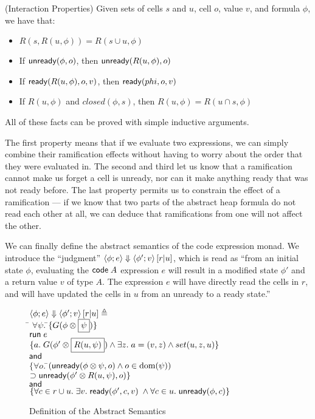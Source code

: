 \documentclass[preprint,natbib]{sigplanconf}
\begin{document}
\begin{prop}{(Interaction Properties)}
Given sets of cells $s$ and $u$, cell $o$, value $v$, and formula $\phi$, we have
that:
\begin{itemize}
\item $R(s, R(u, \phi)) = R(s \cup u, \phi)$
\item If $\mbox{\textsf{{unready}}}({\phi}, {o})$, then $\mbox{\textsf{{unready}}}({R(u, \phi)}, {o})$ 
\item If $\mbox{\textsf{{ready}}}({R(u, \phi)}, {o}, {v})$, then $\mbox{\textsf{{ready}}}({phi}, {o}, {v})$ 
\item If $R(u, \phi)$ and $closed(\phi, s)$, then $R(u, \phi) = R(u \cap s, \phi)$ 
\end{itemize}
\end{prop}

All of these facts can be proved with simple inductive arguments. 

The first property means that if we evaluate two expressions, we can
simply combine their ramification effects without having to worry
about the order that they were evaluated in. The second and third let
us know that a ramification cannot make us forget a cell is unready,
nor can it make anything ready that was not ready before. The last
property permits us to constrain the effect of a ramification --- if we
know that two parts of the abstract heap formula do not read each
other at all, we can deduce that ramifications from one will not
affect the other.

We can finally define the abstract semantics of the code expression
monad. We introduce the ``judgment''
$\left<{\phi};{e}\right>\Downarrow\left<{\phi'};{v}\right>\left[{r}|{u}\right]$, which is read as ``from an initial
state $\phi$, evaluating the $\mbox{\textsf{{code}}}\;{A}$ expression $e$ will result
in a modified state $\phi'$ and a return value $v$ of type $A$. The
expression $e$ will have directly read the cells in $r$, and will have
updated the cells in $u$ from an unready to a ready state.'' 

\begin{figure}
\begin{tabbing}
$\left<{\phi};{e}\right>\Downarrow\left<{\phi'};{v}\right>\left[{r}|{u}\right] \triangleq$ \\[0.5em]
\;\;\= $\forall \psi.\;$\=$\{{G(\phi \otimes \boxed{\psi})}\}$ \\
    \>                  \>${\mbox{\textsf{{run}}}\; e}$ \\
    \>                  \>$\{{a.\;
                             G(\phi' \otimes \boxed{R(u, \psi)})
                             \land \exists z.\; a = (v, z) \land set(u, z, u)}\}$ \\
    \>                  \>$\!\!\;\mbox{\textsf{{and}}}\;$ \\
    \>                  \>$\{\forall o.\;$\=$(\mbox{\textsf{{unready}}}({\phi \otimes \psi}, {o}) \land o \in \mbox{dom}({\psi}))$ \\
    \>                  \> \> $\supset \mbox{\textsf{{unready}}}({\phi' \otimes R(u, \psi)}, {o})\}$ \\
\>$\!\!\;\mbox{\textsf{{and}}}\;$ \\ 
\>$\{\forall c \in r \cup u.\; \exists v.\; \mbox{\textsf{{ready}}}({\phi'}, {c}, {v}) \;\land \forall c \in u.\; \mbox{\textsf{{unready}}}({\phi}, {c})\}$ 
\end{tabbing}
\caption{Definition of the Abstract Semantics}
\label{abstract-semantics}
\end{figure}
\end{document}
